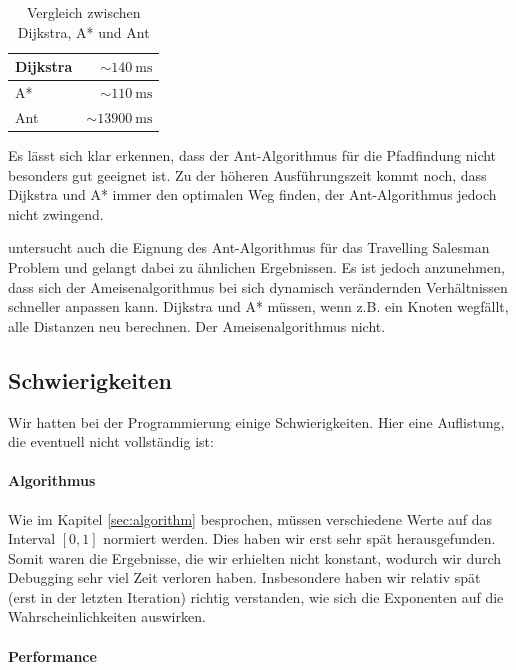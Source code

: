 \begin{table}[h] \begin{tabular}{ | l | r | } \hline Dijkstra &
$\sim\SI{140}{\milli\s}$ \\ \hline A* & $\sim\SI{110}{\milli\s}$ \\ \hline Ant &
$\sim\SI{13900}{\milli\s}$  \\ \hline \end{tabular} \caption{Vergleich zwischen
Dijkstra, A* und Ant} \end{table}

\noindent Es lässt sich klar erkennen, dass der Ant-Algorithmus für die
Pfadfindung nicht besonders gut geeignet ist. Zu der höheren Ausführungszeit
kommt noch, dass Dijkstra und A* immer den optimalen Weg finden, der
Ant-Algorithmus jedoch nicht zwingend.

\citeauthor*{leo-perf} untersucht auch die Eignung des Ant-Algorithmus für das
Travelling Salesman Problem und gelangt dabei zu ähnlichen Ergebnissen. Es ist
jedoch anzunehmen, dass sich der Ameisenalgorithmus bei sich dynamisch
verändernden Verhältnissen schneller anpassen kann. Dijkstra und A* müssen, wenn
z.B. ein Knoten wegfällt, alle Distanzen neu berechnen. Der Ameisenalgorithmus
nicht.

\subsection{Schwierigkeiten}

Wir hatten bei der Programmierung einige Schwierigkeiten. Hier eine Auflistung,
die eventuell nicht vollständig ist:

\paragraph*{Algorithmus}

Wie im Kapitel \ref{sec:algorithm} besprochen, müssen verschiedene Werte auf das
Interval $[0,1]$ normiert werden. Dies haben wir erst sehr spät herausgefunden.
Somit waren die Ergebnisse, die wir erhielten nicht konstant, wodurch wir durch
Debugging sehr viel Zeit verloren haben. Insbesondere haben wir relativ spät
(erst in der letzten Iteration) richtig verstanden, wie sich die Exponenten auf
die Wahrscheinlichkeiten auswirken.

\paragraph*{Performance}

